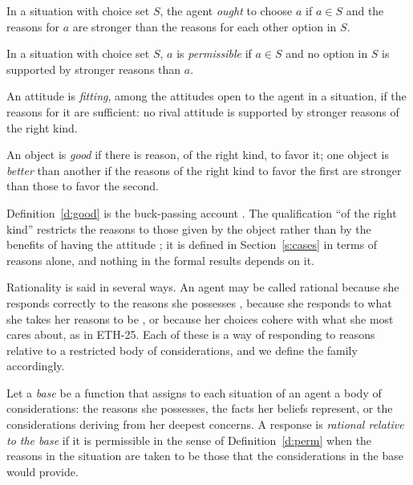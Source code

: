 \documentclass{situationist-preprint}
\begin{document}
\begin{definition}[Ought]\label{d:ought}
In a situation with choice set $S$, the agent \emph{ought} to choose $a$ if $a\in S$ and the reasons for $a$ are stronger than the reasons for each other option in $S$.
\end{definition}

\begin{definition}[Permission]\label{d:perm}
In a situation with choice set $S$, $a$ is \emph{permissible} if $a\in S$ and no option in $S$ is supported by stronger reasons than $a$.
\end{definition}

\begin{definition}[Fittingness]\label{d:fit}
An attitude is \emph{fitting}, among the attitudes open to the agent in a situation, if the reasons for it are sufficient: no rival attitude is supported by stronger reasons of the right kind.
\end{definition}

\begin{definition}\label{d:good}
An object is \emph{good} if there is reason, of the right kind, to favor it; one object is \emph{better} than another if the reasons of the right kind to favor the first are stronger than those to favor the second.
\end{definition}

Definition~\ref{d:good} is the buck-passing account \citep{Scanlon1998}. The qualification \enquote{of the right kind} restricts the reasons to those given by the object rather than by the benefits of having the attitude \citep{Parfit2001}; it is defined in Section~\ref{s:cases} in terms of reasons alone, and nothing in the formal results depends on it.

Rationality is said in several ways. An agent may be called rational because she responds correctly to the reasons she possesses \citep{Lord2018}, because she responds to what she takes her reasons to be \citep{Parfit2011}, or because her choices cohere with what she most cares about, as in ETH-25. Each of these is a way of responding to reasons relative to a restricted body of considerations, and we define the family accordingly.

\begin{definition}\label{d:rational}
Let a \emph{base} be a function that assigns to each situation of an agent a body of considerations: the reasons she possesses, the facts her beliefs represent, or the considerations deriving from her deepest concerns. A response is \emph{rational relative to the base} if it is permissible in the sense of Definition~\ref{d:perm} when the reasons in the situation are taken to be those that the considerations in the base would provide.
\end{definition}
\end{document}
